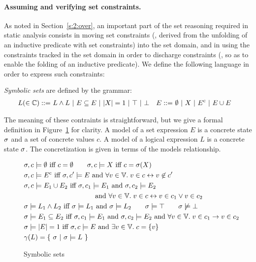 \paragraph{Assuming and verifying set constraints.}
As noted in Section~\ref{s:2:over}, an important part of the set reasoning
required in static analysis consists in moving set constraints (\eg, derived
from the unfolding of an inductive predicate with set constraints) into the
set domain, and in using the constraints tracked in the set domain in order
to discharge constraints (\eg, so as to enable the folding of an inductive
predicate).
We define the following language in order to express such constraints:
\begin{definition}
  \label{d:1:symsets}
  {\em Symbolic sets} are defined by the grammar:
  \begin{align*}
    L (\in \mathbb{C}) ::=
    & \ L \wedge L \
    | \ E \subseteq E \
    | \ |{X}| = 1 \
    | \ \top \
    | \ \bot
    & E ::=
    & \ \emptyset \ | \ X \ | \ {E}^{\mathrm{c}} \ | \ E \cup E
  \end{align*}
\end{definition}
The meaning of these contraints is straightforward, but we give a formal
definition in Figure~\ref{f:4:symsets} for clarity.
A model of a set expression $E$ is a concrete state $\sigma$ and a set
of concrete values $c$.
A model of a logical expression $L$ is a concrete state $\sigma$.
The concretization is given in terms of the models relationship.
\begin{figure}[t]
  \begin{align*}
    & \sigma, c \models \emptyset \textrm{ iff } c = \emptyset
    \qquad
    \sigma, c \models X \textrm{ iff } c = \sigma(X)
    \\
    & \sigma, c \models {E}^{\mathrm{c}}
    \textrm{ iff }
    \sigma, c' \models{E} \textrm{ and } \forall v \in \mathbb{V}.
    \; v \in c \leftrightarrow v \not\in c'
    \\
    & \sigma, c \models E_1 \cup E_2
    \textrm{ iff }
    \sigma, c_1 \models E_1 \textrm{ and } \sigma, c_2 \models E_2
    \\
    & \qquad \qquad \qquad \qquad \qquad  \textrm{ and }
    \forall v \in \mathbb{V}. \; v \in c \leftrightarrow v \in c_1 \vee
    v \in c_2
    \\
    & \sigma \models L_1 \wedge L_2
    \textrm{ iff }
    \sigma \models L_1 \textrm{ and } \sigma \models L_2 \qquad
    \sigma \models \top \qquad \sigma \not\models \bot
    \\
    & \sigma \models E_1 \subseteq E_2
    \textrm{ iff }
    \sigma, c_1 \models E_1 \textrm{ and } \sigma, c_2 \models E_2
    \textrm{ and } \forall v \in \mathbb{V}. \; v \in c_1 \rightarrow v \in c_2
    \\
    & \sigma \models |{E}| = 1
    \textrm{ iff }
    \sigma, c \models E \textrm{ and } \exists v \in \mathbb{V}. \; c = \{v\}
    \\
    & \gamma(L) = \{\ \sigma \ |\  \sigma \models L\ \}
  \end{align*}
  \caption{Symbolic sets}
  \label{f:4:symsets}
\end{figure}
